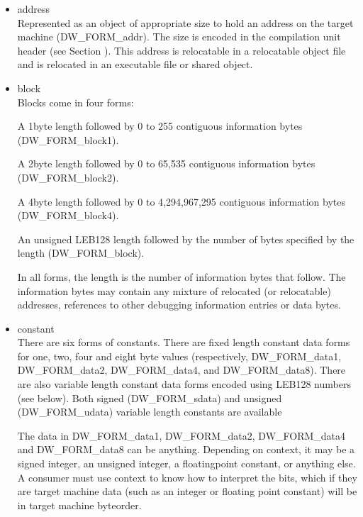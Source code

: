 \begin{itemize}
\item address \\
Represented as an object of appropriate size to hold an
address on the target machine (DW\-\_FORM\-\_addr). The size is
encoded in the compilation unit header 
(see Section ).
This address is relocatable in a relocatable object file and
is relocated in an executable file or shared object.

\item block \\
Blocks come in four forms:

\begin{myindentpara}{1cm}
A 1\dash byte length followed by 0 to 255 contiguous information
bytes (DW\-\_FORM\-\_block1).
\end{myindentpara}

\begin{myindentpara}{1cm}
A 2\dash byte length followed by 0 to 65,535 contiguous information
bytes (DW\-\_FORM\-\_block2).
\end{myindentpara}


\begin{myindentpara}{1cm}
A 4\dash byte length followed by 0 to 4,294,967,295 contiguous
information bytes (DW\-\_FORM\-\_block4).
\end{myindentpara}


\begin{myindentpara}{1cm}
An unsigned LEB128 length followed by the number of bytes
specified by the length (DW\-\_FORM\-\_block).
\end{myindentpara}

In all forms, the length is the number of information bytes
that follow. The information bytes may contain any mixture
of relocated (or relocatable) addresses, references to other
debugging information entries or data bytes.

\item constant \\
There are six forms of constants. There are fixed length
constant data forms for one, two, four and eight byte values
(respectively, DW\-\_FORM\-\_data1, DW\-\_FORM\-\_data2, DW\-\_FORM\-\_data4,
and DW\-\_FORM\-\_data8). There are also variable length constant
data forms encoded using LEB128 numbers (see below). Both
signed (DW\-\_FORM\-\_sdata) and unsigned (DW\-\_FORM\-\_udata) variable
length constants are available

The data in DW\-\_FORM\-\_data1, DW\-\_FORM\-\_data2, DW\-\_FORM\-\_data4 and
DW\-\_FORM\-\_data8 can be anything. Depending on context, it may
be a signed integer, an unsigned integer, a floating\dash point
constant, or anything else. A consumer must use context to
know how to interpret the bits, which if they are target
machine data (such as an integer or floating point constant)
will be in target machine byte\dash order.


\end{itemize}

